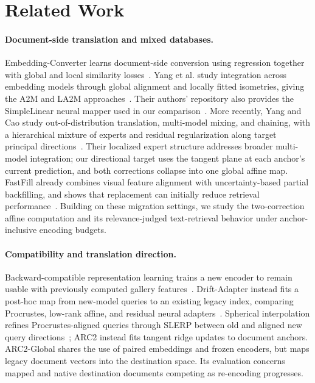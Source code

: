 \section{Related Work}
\label{sec:related}

\paragraph{Document-side translation and mixed databases.}
Embedding-Converter learns document-side conversion using regression together with global and local similarity losses~\cite{embeddingconverter}.
Yang et al. study integration across embedding models through global alignment and locally fitted isometries, giving the A2M and LA2M approaches~\cite{la2m}.
Their authors' repository also provides the SimpleLinear neural mapper used in our comparison~\cite{simplelinear}.
More recently, Yang and Cao study out-of-distribution translation, multi-model mixing, and chaining, with a hierarchical mixture of experts and residual regularization along target principal directions~\cite{yang2026translation}.
Their localized expert structure addresses broader multi-model integration; our directional target uses the tangent plane at each anchor's current prediction, and both corrections collapse into one global affine map.
FastFill already combines visual feature alignment with uncertainty-based partial backfilling, and shows that replacement can initially reduce retrieval performance~\cite{fastfill2023}.
Building on these migration settings, we study the two-correction affine computation and its relevance-judged text-retrieval behavior under anchor-inclusive encoding budgets.

\paragraph{Compatibility and translation direction.}
Backward-compatible representation learning trains a new encoder to remain usable with previously computed gallery features~\cite{shen2020backward}.
Drift-Adapter instead fits a post-hoc map from new-model queries to an existing legacy index, comparing Procrustes, low-rank affine, and residual neural adapters~\cite{driftadapter}.
Spherical interpolation refines Procrustes-aligned queries through SLERP between old and aligned new query directions~\cite{spherical2026}; ARC2 instead fits tangent ridge updates to document anchors.
ARC2-Global shares the use of paired embeddings and frozen encoders, but maps legacy document vectors into the destination space.
Its evaluation concerns mapped and native destination documents competing as re-encoding progresses.

